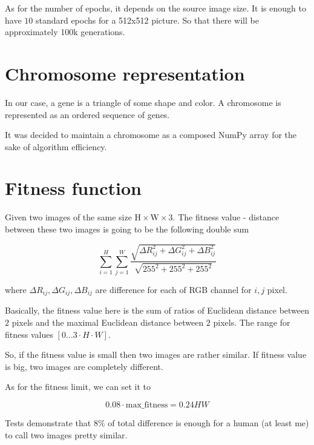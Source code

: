 \documentclass[letterpaper, 16pt]{article}
\newcommand{\vbreak}{\vspace{4mm}}
\begin{document}
\vbreak

As for the number of epochs, it depends on the source image size. It is enough to have $10$ standard epochs for a 512x512 picture. So that there will be approximately 100k generations.


\section{Chromosome representation}

In our case, a gene is a triangle of some shape and color. A chromosome is represented as an ordered sequence of genes. 

\vbreak

It was decided to maintain a chromosome as a composed NumPy array for the sake of algorithm efficiency. 

\section{Fitness function}

Given two images of the same size $\text{H}\times \text{W} \times 3$. The fitness value - distance between these two images is going to be the following double sum

\vbreak

$$\sum_{i=1}^{H} \sum_{j=1}^{W} \frac{\sqrt{\Delta R_{ij}^2 + \Delta G_{ij}^2 + \Delta B_{ij}^2}}{\sqrt{255^2 + 255^2 + 255^2}}$$

\vbreak

where $\Delta R_{ij}, \Delta G_{ij}, \Delta B_{ij}$ are difference for each of RGB channel for $i, j$ pixel. 

\vbreak

Basically, the fitness value here is the sum of ratios of Euclidean distance between $2$ pixels and the maximal Euclidean distance between $2$ pixels. The range for fitness values $\left[ 0 \dots 3 \cdot H \cdot W \right]$.

\vbreak

So, if the fitness value is small then two images are rather similar. If fitness value is big, two images are completely different.

\vbreak

As for the fitness limit, we can set it to 

$$0.08 \cdot \text{max\_fitness} = 0.24 H W$$

Tests demonstrate that $8\%$ of total difference is enough for a human (at least me) to call two images pretty similar.
\end{document}
